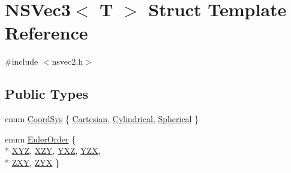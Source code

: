\hypertarget{structNSVec3}{\section{N\-S\-Vec3$<$ T $>$ Struct Template Reference}
\label{structNSVec3}
}


{\ttfamily \#include $<$nsvec2.\-h$>$}

\subsection*{Public Types}
\begin{DoxyCompactItemize}
\item 
enum \hyperlink{structNSVec3_a79e942f48c6360d21b4e167c1ea890e2}{Coord\-Sys} \{ \hyperlink{structNSVec3_a79e942f48c6360d21b4e167c1ea890e2ab7be2cd66aaa6bee02585772e2db1f8d}{Cartesian}, 
\hyperlink{structNSVec3_a79e942f48c6360d21b4e167c1ea890e2aa64b3bd7041029c4900ac1364881dc28}{Cylindrical}, 
\hyperlink{structNSVec3_a79e942f48c6360d21b4e167c1ea890e2a44ae9edc1ff970062a71280b815ac03b}{Spherical}
 \}
\item 
enum \hyperlink{structNSVec3_a1d9e373d933930ba26c0206912bbd7be}{Euler\-Order} \{ \\*
\hyperlink{structNSVec3_a1d9e373d933930ba26c0206912bbd7bea7d78982d25e830ab70c31e8125c2363f}{X\-Y\-Z}, 
\hyperlink{structNSVec3_a1d9e373d933930ba26c0206912bbd7beaabd66dcf41a62c69c68d38b331b17ff7}{X\-Z\-Y}, 
\hyperlink{structNSVec3_a1d9e373d933930ba26c0206912bbd7beab5df2d8286736736b5da5a0d6573429c}{Y\-X\-Z}, 
\hyperlink{structNSVec3_a1d9e373d933930ba26c0206912bbd7beaf187eb5f360ef2e52da3452c61edf7ef}{Y\-Z\-X}, 
\\*
\hyperlink{structNSVec3_a1d9e373d933930ba26c0206912bbd7bea5448056baeadf50fe6461d68bb796a3e}{Z\-X\-Y}, 
\hyperlink{structNSVec3_a1d9e373d933930ba26c0206912bbd7bea708f75b377b3475f98fbf11b93dca4ed}{Z\-Y\-X}
 \}
\end{DoxyCompactItemize}
